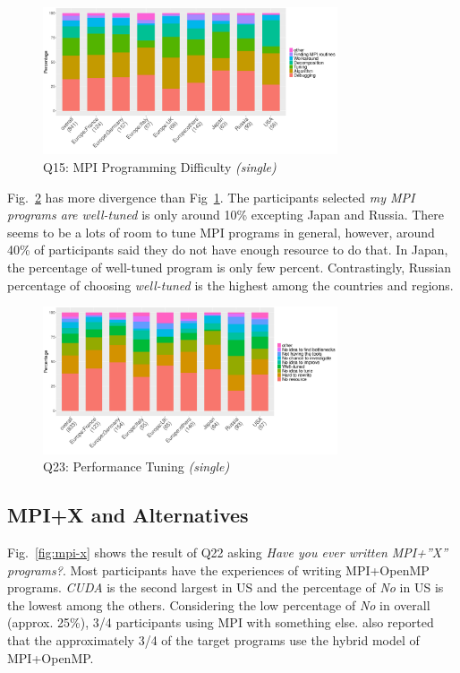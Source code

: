 \documentclass[preprint,5p,times]{elsarticle}
\def\myquote#1{{\it #1}}
\begin{document}
\begin{figure}[htb]
\begin{center}
\includegraphics[width=8.7cm]{R-scripts/Q15.pdf}
\caption{Q15: MPI Programming Difficulty {\it(single)}}
\label{fig:difficulty}
\end{center}
\end{figure}

Fig.~\ref{fig:tuning} has more divergence than
Fig~\ref{fig:difficulty}. The participants selected \myquote{my MPI
  programs are well-tuned} is only around 10\% excepting Japan and
Russia. There seems to be a lots of room to tune MPI programs in
general, however, around 40\% of participants said they do not have
enough resource to do that. In Japan, the percentage of well-tuned
program is only few percent. Contrastingly, Russian percentage of
choosing \myquote{well-tuned} is the highest among the countries and
regions.

\begin{figure}[htb]
\begin{center}
\includegraphics[width=8.7cm]{R-scripts/Q23.pdf}
\caption{Q23: Performance Tuning {\it(single)}}
\label{fig:tuning}
\end{center}
\end{figure}

\subsection{MPI+X and Alternatives}

Fig.~\ref{fig:mpi-x} shows the result of Q22 asking \myquote{Have you ever
written MPI+''X'' programs?}. Most participants have the experiences of
writing MPI+OpenMP programs. \myquote{CUDA} is the second largest in
US and the percentage of \myquote{No} in US is the lowest among the
others. Considering the low percentage of \myquote{No} in overall (approx.
25\%), 3/4 participants using MPI with something else.
\cite{10.1145/3295500.3356176} also reported that the approximately 3/4 of
the target programs use the hybrid model of MPI+OpenMP.
\end{document}
